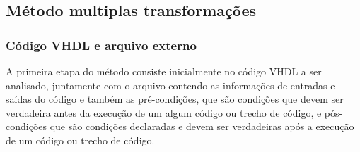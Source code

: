 
\subsection{Método multiplas transformações}

\subsubsection{Código VHDL e arquivo externo}
\label{cap:vhdl_assertivas}

A primeira etapa do método consiste inicialmente no código VHDL a ser analisado, juntamente com o arquivo contendo as informações de entradas e saídas do código e também as pré-condições, que são condições que devem ser verdadeira antes da execução de um algum código ou trecho de código, e pós-condições que são condições declaradas e devem ser verdadeiras após a execução de um código ou trecho de código.

